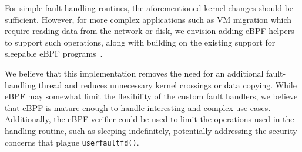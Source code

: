 For simple fault-handling routines, the aforementioned kernel changes should be sufficient. However, for more complex applications such as VM migration which require reading data from the network or disk, we envision adding eBPF helpers to support such operations, along with building on the existing support for sleepable eBPF programs~\cite{sleepable-bpf}.

We believe that this implementation removes the need for an additional fault-handling thread and reduces unnecessary kernel crossings or data copying. While eBPF may somewhat limit the flexibility of the custom fault handlers, we believe that eBPF is mature enough to handle interesting and complex use cases. Additionally, the eBPF verifier could be used to limit the operations used in the handling routine, such as sleeping indefinitely, potentially addressing the security concerns that plague \texttt{userfaultfd()}.
